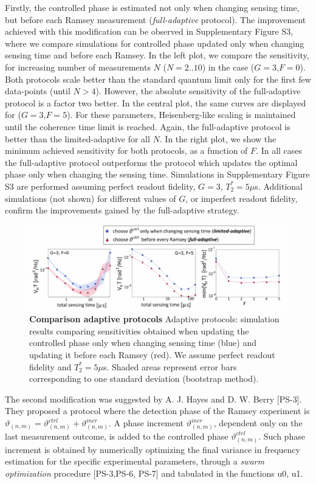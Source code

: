 \documentclass{report}
\begin{document}
Firstly, the controlled phase is estimated not only when changing sensing time, but before each Ramsey measurement (\textit{full-adaptive} protocol). The improvement achieved with this modification can be observed in Supplementary Figure S3, where we compare simulations for controlled phase updated only when changing sensing time and before each Ramsey. In the left plot, we compare the sensitivity, for increasing number of measurements $N$ ($N=2..10$) in the case ($G=3$,$F=0$). Both protocols scale better than the standard quantum limit only for the first few data-points (until $N>4$). However, the absolute sensitivity of the full-adaptive protocol is a factor two better. In the central plot, the same curves are displayed for ($G=3$,$F=5$). For these parameters, Heisenberg-like scaling is maintained until the coherence time limit is reached. Again, the full-adaptive protocol is better than the limited-adaptive for all $N$. In the right plot, we show the minimum achieved sensitivity for both protocols, as a function of $F$. In all cases the full-adaptive protocol outperforms the protocol which updates the optimal phase only when changing the sensing time. Simulations in Supplementary Figure S3 are performed assuming perfect readout fidelity, $G=3$, $T_2^* = 5 \mu$s.   Additional simulations (not shown) for different values of $G$, or imperfect readout fidelity, confirm the improvements gained by the full-adaptive strategy. \\
\begin{figure}[h]
	\centering
	\includegraphics[width=12cm]{figures/fig_S3_new}
	\caption{\label{fig:ammS6} \textbf{Comparison adaptive protocols} Adaptive protocols: simulation results comparing sensitivities obtained when updating the controlled phase only when changing sensing time (blue) and updating it before each Ramsey (red). We assume perfect readout fidelity and $T_2^* = 5\mu$s. Shaded areas represent error bars corresponding to one standard deviation (bootstrap method). 
	}
\end{figure}
The second modification was suggested by A. J. Hayes and D. W. Berry [PS-3]. They proposed a protocol where the detection phase of the Ramsey experiment is $\vartheta_{(n,m)} = \vartheta_{(n,m)}^{ctrl} + \vartheta_{(n,m)}^{incr}$. A phase increment $\vartheta_{(n,m)}^{incr}$, dependent only on the last measurement outcome, is added to the controlled phase $\vartheta_{(n,m)}^{ctrl}$. Such phase increment is obtained by numerically optimizing the final variance in frequency estimation for the specific experimental parameters, through a \textit{swarm optimization} procedure [PS-3,PS-6, PS-7] and tabulated in the functions u0, u1. \\
\end{document}
